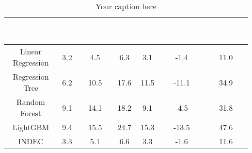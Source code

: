 \begin{table}[htb]
\centering
\begin{tabular}{|c|c|c|c|c|c|c|}
\hline
\textbf{\cellcolor[rgb]{0,0.231,0.427}\textcolor{white}{Method}} & \textbf{\cellcolor[rgb]{0,0.231,0.427}\textcolor{white}{Q1}} & \textbf{\cellcolor[rgb]{0,0.231,0.427}\textcolor{white}{Median}} & \textbf{\cellcolor[rgb]{0,0.231,0.427}\textcolor{white}{Q3}} & \textbf{\cellcolor[rgb]{0,0.231,0.427}\textcolor{white}{IQR}} & \textbf{\cellcolor[rgb]{0,0.231,0.427}\textcolor{white}{Lower Bound}} & \textbf{\cellcolor[rgb]{0,0.231,0.427}\textcolor{white}{Upper Bound}} \\ \hline
Linear Regression & 3.2 & 4.5 & 6.3 & 3.1 & -1.4 & 11.0 \\
Regression Tree & 6.2 & 10.5 & 17.6 & 11.5 & -11.1 & 34.9 \\
Random Forest & 9.1 & 14.1 & 18.2 & 9.1 & -4.5 & 31.8 \\
LightGBM & 9.4 & 15.5 & 24.7 & 15.3 & -13.5 & 47.6 \\
INDEC & 3.3 & 5.1 & 6.6 & 3.3 & -1.6 & 11.6 \\
\hline
\end{tabular}
\caption{Your caption here}
\label{tab:my_table}
\end{table}
